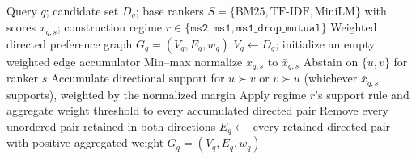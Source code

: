 \begin{algorithm}[t]
\caption{Canonical preference-graph construction for one query}
\label{alg:construction}
\begin{algorithmic}[1]
\Require Query $q$; candidate set $D_q$; base rankers $S=\{\mathrm{BM25},
  \mathrm{TF\text{-}IDF}, \mathrm{MiniLM}\}$ with scores $x_{q,s}$;
  construction regime $r \in \{\texttt{ms2}, \texttt{ms1},
  \texttt{ms1\_drop\_mutual}\}$
\Ensure Weighted directed preference graph $G_q=(V_q,E_q,w_q)$
\State $V_q \gets D_q$; initialize an empty weighted edge accumulator
  \State Min--max normalize $x_{q,s}$ to $\bar{x}_{q,s}$
      \State Abstain on $\{u,v\}$ for ranker $s$
    \Else
      \State Accumulate directional support for $u \succ v$ or $v \succ u$
        (whichever $\bar{x}_{q,s}$ supports), weighted by the normalized
        margin
    \EndIf
  \EndFor
\EndFor
\State Apply regime $r$'s support rule and aggregate weight threshold to
  every accumulated directed pair
  \State Remove every unordered pair retained in both directions
\EndIf
\State $E_q \gets$ every retained directed pair with positive aggregated weight
\State \Return $G_q = (V_q, E_q, w_q)$
\end{algorithmic}
\end{algorithm}